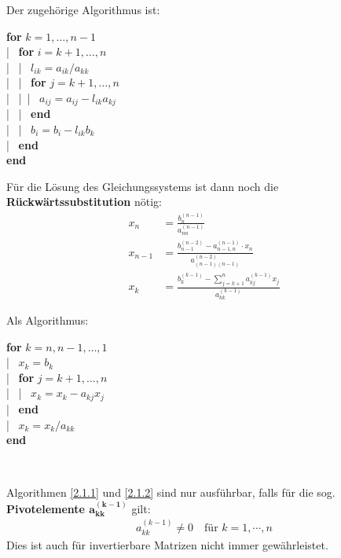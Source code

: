 Der zugehörige Algorithmus ist:

\begin{pseudocode}{0.5\linewidth}
  \textbf{for} $ k = 1, \ldots , n-1$\\
  |~	\> \textbf{for} $i = k + 1, \ldots , n$ \\
  |~	\> |~\> $l_{ik} = a_{ik} /a_{kk}$\\
  |~	\> |~\> \textbf{for} $j = k + 1, \ldots , n$ \\
  |~	\> |~\>|~\> $a_{ij} = a_{ij} - l_{ik} a_{kj} $\\
  |~	\> |~\> \textbf{end}\\
  |~	\> |~\> $b_i = b_i -  l_{ik} b_k $\\
  |~	\> \textbf{end} \\
  \textbf{end}
\end{pseudocode}

\label{2.1.2}
Für die Lösung des Gleichungssystems ist dann noch die
\textbf{Rückwärtssubstitution}  nötig:
\begin{align}
  x_n &= \frac{b_n^{(n-1)}}{a_{nn}^{(n-1)}} \label{II.1.5} \\
  x_{n-1} &=  \frac{b_{n-1}^{(n-2)}-a_{n-1,n}^{(n-1)}\cdot x_n}
            {a_{(n-1)(n-1)}^{(n-2)}} \label{II.1.6} \\
  x_k &= \frac{b_k^{(k-1)}-\sum_{j=k+1}^{n}a_{kj}^{(k-1)}x_j}
        {a_{kk}^{(k-1)}} \label{II.1.7}
\end{align}

Als Algorithmus:

\begin{pseudocode}{0.5\linewidth}
  \textbf{for} $k = n, n -1, \ldots , 1$ \\
  |~		\>$x_k = b_k$ \\
  |~		\>\textbf{for} $j = k + 1, \ldots , n$ \\
  |~		\>|~	$x_k = x_k - a_{kj}x_j$ \\
  |~		\>\textbf{end} \\
  |~		\>$x_k = x_k /a_{kk}$ \\
  \textbf{end}
\end{pseudocode}~\\

\begin{Beme}
  Algorithmen \ref{2.1.1} und \ref{2.1.2} sind nur ausführbar,
  falls für die sog. \textbf{Pivotelemente $\mathbf{a_{kk}^{(k-1)}}$ }  gilt:
  \begin{gather*}
    a_{kk}^{(k-1)} \neq 0 \quad   \text{für } k=1, \cdots , n
  \end{gather*}
  Dies ist auch für invertierbare Matrizen nicht immer gewährleistet.
\end{Beme}


